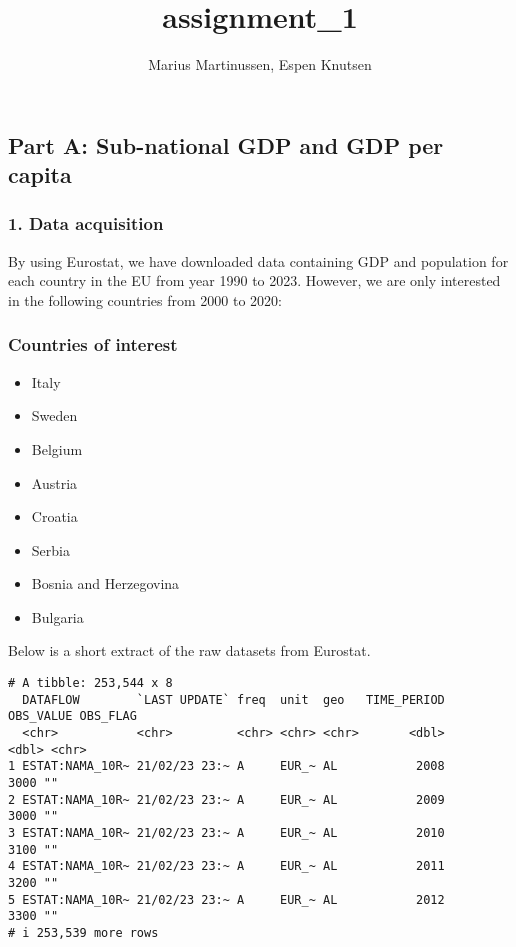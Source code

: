 \documentclass[
  letterpaper,
  DIV=11,
  numbers=noendperiod]{scrartcl}
\title{assignment\_1}
\author{Marius Martinussen, Espen Knutsen}
\date{}
\providecommand{\tightlist}{%
  \setlength{\itemsep}{0pt}\setlength{\parskip}{0pt}}\usepackage{longtable,booktabs,array}
\begin{document}
\maketitle
\ifdefined\Shaded\renewenvironment{Shaded}{\begin{tcolorbox}[breakable, interior hidden, borderline west={3pt}{0pt}{shadecolor}, sharp corners, boxrule=0pt, enhanced, frame hidden]}{\end{tcolorbox}}\fi

\hypertarget{part-a-sub-national-gdp-and-gdp-per-capita}{%
\subsection{Part A: Sub-national GDP and GDP per
capita}\label{part-a-sub-national-gdp-and-gdp-per-capita}}

\hypertarget{data-acquisition}{%
\subsubsection{1. Data acquisition}\label{data-acquisition}}

By using Eurostat, we have downloaded data containing GDP and population
for each country in the EU from year 1990 to 2023. However, we are only
interested in the following countries from 2000 to 2020:

\hypertarget{countries-of-interest}{%
\subsubsection{Countries of interest}\label{countries-of-interest}}

\begin{itemize}
\tightlist
\item
  Italy
\item
  Sweden
\item
  Belgium
\item
  Austria
\item
  Croatia
\item
  Serbia
\item
  Bosnia and Herzegovina
\item
  Bulgaria
\end{itemize}

Below is a short extract of the raw datasets from Eurostat.

\begin{verbatim}
# A tibble: 253,544 x 8
  DATAFLOW        `LAST UPDATE` freq  unit  geo   TIME_PERIOD OBS_VALUE OBS_FLAG
  <chr>           <chr>         <chr> <chr> <chr>       <dbl>     <dbl> <chr>   
1 ESTAT:NAMA_10R~ 21/02/23 23:~ A     EUR_~ AL           2008      3000 ""      
2 ESTAT:NAMA_10R~ 21/02/23 23:~ A     EUR_~ AL           2009      3000 ""      
3 ESTAT:NAMA_10R~ 21/02/23 23:~ A     EUR_~ AL           2010      3100 ""      
4 ESTAT:NAMA_10R~ 21/02/23 23:~ A     EUR_~ AL           2011      3200 ""      
5 ESTAT:NAMA_10R~ 21/02/23 23:~ A     EUR_~ AL           2012      3300 ""      
# i 253,539 more rows
\end{verbatim}
\end{document}
